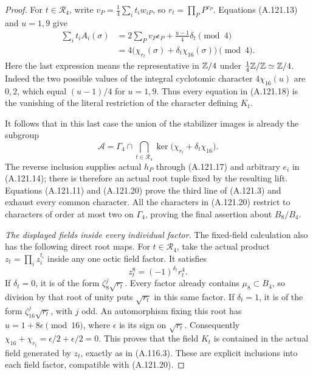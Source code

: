 \begin{proof}
For $t\in\mathcal R_4$, write
$v_P=\frac14\sum_i t_iw_{iP}$, so $r_t=\prod_PP^{v_P}$.
Equations (A.121.13) and $u=1,9$ give
\[
 \begin{split}
 \sum_i t_iA_i(\sigma)
    &=2\sum_Pv_P\epsilon_P
                     +\frac{u-1}{4}\delta_t\pmod4\\
    &=4\bigl(\chi_{r_t}(\sigma)
                          +\delta_t\chi_{16}(\sigma)\bigr)
                                                 \pmod4.
 \end{split}
\tag{A.121.19}
\]
Here the last expression means the representative in
$\mathbb Z/4$ under $\tfrac14\mathbb Z/\mathbb Z\simeq\mathbb Z/4$.
Indeed the two possible values of the integral
cyclotomic character $4\chi_{16}(u)$ are $0,2$,
which equal $(u-1)/4$ for $u=1,9$.
Thus every equation in (A.121.18) is the vanishing
of the literal restriction of the character defining $K_t$.

It follows that in this last case the union of the
stabilizer images is already the subgroup
\[
 \mathcal A=
 \Gamma_4\cap
    \bigcap_{t\in\mathcal R_4}
       \ker\bigl(\chi_{r_t}+\delta_t\chi_{16}\bigr).
\tag{A.121.20}
\]
The reverse inclusion supplies actual $h_P$ through
(A.121.17) and arbitrary $e_i$ in (A.121.14);
there is therefore an actual root tuple fixed by the
resulting lift.
Equations (A.121.11) and (A.121.20) prove the third
line of (A.121.3) and exhaust every common character.
All the characters in (A.121.20) restrict to characters
of order at most two on $\Gamma_4$, proving the final
assertion about $B_8/B_4$.

\emph{The displayed fields inside every individual factor.}
The fixed-field calculation also has the following
direct root maps.
For $t\in\mathcal R_4$, take the actual product
$z_t=\prod_i z_i^{t_i}$ inside any one octic field
factor.
It satisfies
\[
                         z_t^8=(-1)^{\delta_t}r_t^4.
\tag{A.121.21}
\]
If $\delta_t=0$, it is of the form
$\zeta_8^j\sqrt{r_t}$.
Every factor already contains $\mu_8\subset B_4$,
so division by that root of unity puts
$\sqrt{r_t}$ in this same factor.
If $\delta_t=1$, it is of the form
$\zeta_{16}^j\sqrt{r_t}$, with $j$ odd.
An automorphism fixing this root has
$u=1+8\epsilon\pmod{16}$, where $\epsilon$
is its sign on $\sqrt{r_t}$.
Consequently
$\chi_{16}+\chi_{r_t}=\epsilon/2+\epsilon/2=0$.
This proves that the field $K_t$ is contained in the
actual field generated by $z_t$, exactly as in
(A.116.3).
These are explicit inclusions into each field factor,
compatible with (A.121.20).


\end{proof}

